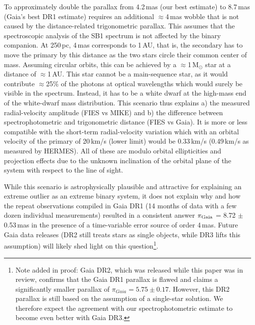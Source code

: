 \documentclass[twocolumn]{aastex6}
\begin{document}
To approximately double the parallax from 4.2\,mas (our best estimate) to 8.7\,mas (Gaia's best DR1 estimate) requires an additional $\approx$4\,mas wobble that is not caused by the distance-related trigonometric parallax. This assumes that the spectroscopic analysis of the SB1 spectrum is not affected by the binary companion. At 250\,pc, 4\,mas corresponds to 1\,AU, that is, the secondary has to move the primary by this distance as the two stars circle their common center of mass. Assuming circular orbits, this can be achieved by a $\approx$1\,M$_\odot$ star at a distance of $\approx$1\,AU. This star cannot be a main-sequence star, as it would contribute $\approx$25\% of the photons at optical wavelengths which would surely be visible in the spectrum. Instead, it has to be a white dwarf at the high-mass end of the white-dwarf mass distribution. This scenario thus explains a) the measured radial-velocity amplitude (FIES vs MIKE) and b) the difference between spectrophotometric and trigonometric distance (FIES vs Gaia). It is more or less compatible with the short-term radial-velocity variation which with an orbital velocity of the primary of 20\,km/s (lower limit) would be 0.33\,km/s (0.49\,km/s as measured by HERMES). All of these are modulo orbital ellipticities and projection effects due to the unknown inclination of the orbital plane of the system with respect to the line of sight.

While this scenario is astrophysically plausible and attractive for explaining an extreme outlier as an extreme binary system, it does not explain why and how the repeat observations compiled in Gaia DR1 (14 months of data with a few dozen individual measurements) resulted in a consistent answer $\pi_{\rm Gaia}$ = 8.72 $\pm$ 0.53\,mas in the presence of a time-variable error source of order 4\,mas. Future Gaia data releases (DR2 still treats stars as single objects, while DR3 lifts this assumption) will likely shed light on this question\footnote{Note added in proof: Gaia DR2, which was released while this paper was in review, confirms that the Gaia DR1 parallax is flawed and claims a significantly smaller parallax of $\pi_{Gaia}=5.75\pm 0.17$. However, this DR2 parallax is still based on the assumption of a single-star
solution. We therefore expect the agreement with our spectrophotometric estimate to become even better with Gaia DR3.}. 
\end{document}
